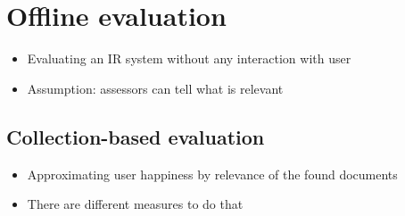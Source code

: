 \section{Offline evaluation}
\begin{itemize}
	\item Evaluating an IR system without any interaction with user 
	\item Assumption: assessors can tell what is relevant
\end{itemize}
\subsection{Collection-based evaluation}
\begin{itemize}
	\item Approximating user happiness by relevance of the found documents
	\item There are different measures to do that
\end{itemize}
